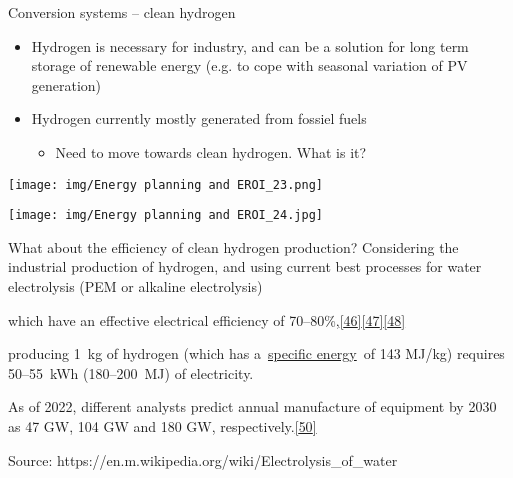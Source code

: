 \begin{frame}{Conversion systems -- clean hydrogen}
\label{conversion-systems-clean-hydrogen}
\begin{itemize}
\tightlist
\item
  Hydrogen is necessary for industry, and can be a solution for long
  term storage of renewable energy (e.g. to cope with seasonal variation
  of PV generation)
\item
  Hydrogen currently mostly generated from fossiel fuels

  \begin{itemize}
  \tightlist
  \item
    Need to move towards clean hydrogen. What is it?
  \end{itemize}
\end{itemize}

\texttt{[image: img/Energy planning and EROI\_23.png]}

\texttt{[image: img/Energy planning and EROI\_24.jpg]}
\end{frame}

\begin{frame}{What about the efficiency of clean hydrogen production?}
\label{what-about-the-efficiency-of-clean-hydrogen-production}
Considering the industrial production of hydrogen, and using current
best processes for water electrolysis (PEM or alkaline electrolysis)

which have an effective electrical efficiency of
70--80\%,\href{https://en.m.wikipedia.org/wiki/Electrolysis_of_water\#cite_note-46}{{[}46{]}}\href{https://en.m.wikipedia.org/wiki/Electrolysis_of_water\#cite_note-47}{{[}47{]}}\href{https://en.m.wikipedia.org/wiki/Electrolysis_of_water\#cite_note-48}{{[}48{]}}

producing 1~kg of hydrogen (which has
a~\href{https://en.m.wikipedia.org/wiki/Specific_energy}{specific
energy}~of 143 MJ/kg) requires 50--55~kWh (180--200~MJ) of electricity.

As of 2022, different analysts predict annual manufacture of equipment
by 2030 as 47 GW, 104 GW and 180 GW,
respectively.\href{https://en.m.wikipedia.org/wiki/Electrolysis_of_water\#cite_note-50}{{[}50{]}}

Source: https://en.m.wikipedia.org/wiki/Electrolysis\_of\_water
\end{frame}

